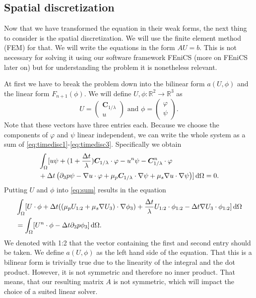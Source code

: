 \documentclass[12pt,a4paper,twoside, open=right]{scrreprt}
\theoremstyle{definition}
\theoremstyle{plain}
\newcommand{\rr}{\mathbb{R}}
\newcommand{\bfC}{\bm{C}}
\newcommand{\D}{\mathop{}\!\mathrm{d}}
\begin{document}
\subsection{Spatial discretization}
Now that we have transformed the equation in their weak forms, the next thing to consider is the spatial discretization. We will use the finite element method (FEM) for that. We will write the equations in the form $AU=b$. This is not necessary for solving it using our software framework FEniCS (more on FEniCS later on) but for understanding the problem it is nonetheless relevant. 
\par 
At first we have to break the problem down into the bilinear form $a(U,\phi)$ and the linear form $F_{n+1}(\phi)$. We will define $U,\phi\colon\rr^2\to\rr^3$ as
\begin{equation}
   U=\begin{pmatrix}
   \bfC_{1/\lambda}\\u
   \end{pmatrix} \text{ and } 
   \phi=\begin{pmatrix}
   \varphi\\\psi
   \end{pmatrix}.
\end{equation}
Note that these vectors have three entries each. Because we choose the components of $\varphi$   and $\psi$ linear independent, we can write the whole system as a sum of \eqref{eq:timedisc1}-\eqref{eq:timedisc3}. Specifically we obtain 
\begin{align}
\label{eq:sum}
    &\int_\Omega[ u\psi +(1+\frac{\Delta t}{\lambda})\bfC_{1/\lambda}\cdot\varphi - u^n\psi-\bfC_{1/\lambda}^n\cdot\varphi\\\notag&+\Delta t\left(\partial_3 p\psi-\nabla u\cdot\varphi+\mu_p\bfC_{1/\lambda}\cdot\nabla\psi +\mu_s\nabla u\cdot\nabla\psi\right)]\D\Omega =0.
\end{align}
Putting $U$ and $\phi$ into \eqref{eq:sum} results in the equation
\begin{align}
\label{eq:sumcon}
    &\int_\Omega[U\cdot\phi+\Delta t((\mu_pU_{1:2}+\mu_s\nabla U_3)\cdot\nabla\phi_3)+\frac{\Delta t}{\lambda}U_{1:2}\cdot\phi_{1:2}-\Delta t\nabla U_3\cdot\phi_{1:2}]\D\Omega\\\notag
    &=\int_\Omega [U^n\cdot\phi-\Delta t\partial_3 p\phi_3]\D\Omega.
\end{align}
We denoted with 1:2 that the vector containing the first and second entry should be taken. We define $a(U,\phi)$ as the left hand side of the equation. That this is a bilinear form is trivially true due to the linearity of the integral and the dot product. However, it is not symmetric and therefore no inner product. That means, that our resulting matrix $A$ is not symmetric, which will impact the choice of a suited linear solver.\par 
\end{document}
